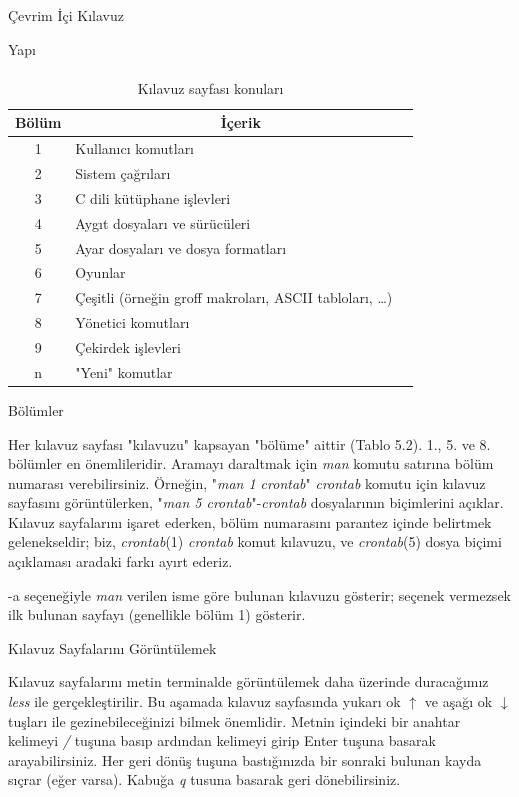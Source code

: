 \begin{section}{Çevrim İçi Kılavuz}
\begin{subsection}{Yapı}
\paragraph{}{
\begin {table}[H]
\caption {Kılavuz sayfası konuları} \label{tab:title} 
\begin{tabular}{c l @{} l}
\hline
Bölüm &
\multicolumn{2}{c}{İçerik} \\
\hline
1 	&	Kullanıcı komutları \\
2 &	Sistem çağrıları \\
3 &	C dili kütüphane işlevleri \\
4 &	Aygıt dosyaları ve sürücüleri \\
5 &	Ayar dosyaları ve dosya formatları \\
6 & Oyunlar \\
7 &	Çeşitli (örneğin groff makroları, ASCII tabloları, …) \\
8 &	Yönetici komutları \\
9 &	Çekirdek işlevleri \\
n & "Yeni" komutlar \\
\hline
\end{tabular}
\end {table}
}
\end{subsection}
\begin{subsection}{Bölümler}

Her kılavuz sayfası "kılavuzu" kapsayan "bölüme" aittir (Tablo 5.2). 1., 5. ve 8. bölümler en önemlileridir. Aramayı daraltmak için \emph{man} komutu satırına bölüm numarası verebilirsiniz. Örneğin, "\emph{man 1 crontab}" \emph{crontab} komutu için kılavuz sayfasını görüntülerken, "\emph{man 5 crontab}"-\emph{crontab} dosyalarının biçimlerini açıklar. Kılavuz sayfalarını işaret ederken, bölüm numarasını parantez içinde belirtmek gelenekseldir; biz, \emph{crontab}(1) \emph{crontab} komut kılavuzu, ve \emph{crontab}(5) dosya biçimi açıklaması aradaki farkı ayırt ederiz.

-a seçeneğiyle \emph{man} verilen isme göre bulunan kılavuzu gösterir; seçenek vermezsek ilk bulunan sayfayı (genellikle bölüm 1) gösterir.
\end{subsection}
\begin{subsection}{Kılavuz Sayfalarını Görüntülemek}

Kılavuz sayfalarını metin terminalde görüntülemek daha üzerinde duracağımız \emph{less} ile gerçekleştirilir. Bu aşamada kılavuz sayfasında yukarı ok \begin{math}\uparrow\end{math} ve aşağı ok \begin{math}\downarrow\end{math} tuşları ile gezinebileceğinizi bilmek önemlidir. Metnin içindeki bir anahtar kelimeyi \emph{/} tuşuna basıp ardından kelimeyi girip Enter tuşuna basarak arayabilirsiniz. Her geri dönüş tuşuna bastığınızda bir sonraki bulunan kayda sıçrar (eğer varsa). Kabuğa \emph{q} tusuna basarak geri dönebilirsiniz.


\end{subsection}
\end{section}
